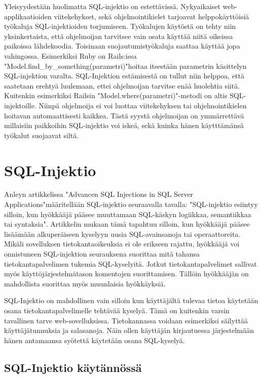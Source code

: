 \documentclass[finnish]{tktltiki2}
\theoremstyle{definition}
\theoremstyle{remark}
\begin{document}
	Yleisyydestään huolimatta SQL-injektio on estettävissä. Nykyaikaiset web-applikaatioiden viitekehykset, sekä ohjelmointikielet tarjoavat helppokäyttöisiä työkaluja SQL-injektioiden torjumiseen. Työkalujen käytöstä on tehty niin yksinkertaista, että ohjelmoijan tarvitsee vain osata käyttää niitä oikeissa paikoissa lähdekoodia. Toisinaan suojautumistyökaluja saattaa käyttää jopa vahingossa. Esimerkiksi Ruby on Rails:issa  "Model.find\_by\_something(parametri)"\space hoitaa itsestään parametrin käsittelyn SQL-injektion varalta. SQL-Injektion estämisestä on tullut niin helppoa, että saatetaan erehtyä luulemaan, ettei ohjelmoijan tarvitse enää huolehtia siitä. Kuitenkin esimerkiksi Railsin "Model.where(parametri)"\space -metodi on altis SQL-injektoille. Niinpä ohjelmoija ei voi luottaa viitekehyksen tai ohjelmointikielen hoitavan automaattisesti kaikkea. Tästä syystä ohjelmoijan on ymmärrettävä millaisiin paikkoihin SQL-injektio voi iskeä, sekä kuinka hänen käytttämänsä työkalut suojaavat siltä.
	
	
	\section{SQL-Injektio}
	Anleyn artikkelissa "Advancen SQL Injections in SQL Server Applications"\space\cite{definition}\space määritellään SQL-injektio seuraavalla tavalla: "SQL-injektio esiintyy silloin, kun hyökkääjä pääsee muuttamaan SQL-käskyn logiikkaa, semantiikkaa tai syntaksia". Artikkelin mukaan tämä tapahtuu silloin, kun hyökkääjä pääsee lisäämään alkuperäiseen kyselyyn uusia SQL-avainsanoja tai operaattoreita.
	Mikäli sovelluksen tietokantaoikeuksia ei ole erikseen rajattu, hyökkääjä voi onnistuneen SQL-injektion seurauksena suorittaa mitä tahansa tietokantapalvelimen tukemia SQL-kyselyitä. Jotkut tietokantapalvelimet sallivat myös käyttöjärjestelmätason komentojen suorittamisen. Tällöin hyökkääjän on mahdollista suorittaa myös muunlaisia hyökkäyksiä. 
	
	SQL-Injektio on mahdollinen vain silloin kun käyttäjältä tulevaa tietoa käytetään osana tietokantapalvelimelle tehtävää kyselyä. Tämä on kuitenkin varsin tavallinen tarve web-sovelluksissa. Tietokannassa voidaan esimerkiksi säilyttää käyttäjätunnuksia ja salasanoja. Näin ollen käyttäjän kirjautuessa järjestelmään hänen antamaansa syötettä käytetään osana SQL-kyselyä.
	
	\subsection{SQL-Injektio käytännössä}
	
\end{document}
